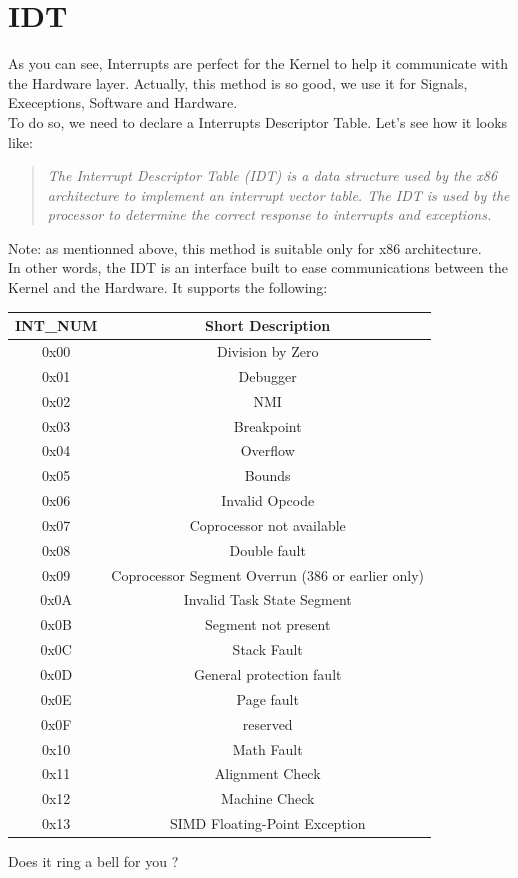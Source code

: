 \documentclass{42-en}
\begin{document}
	\section{IDT}
	As you can see, Interrupts are perfect for the Kernel to help it
    communicate with the Hardware layer. Actually, this method is so
    good, we use it for Signals, Execeptions, Software and Hardware.\\
	To do so, we need to declare a Interrupts Descriptor Table. Let's
    see how it looks like:
	\begin{quotation}
		\textit{The Interrupt Descriptor Table (IDT) is a data
          structure used by the x86 architecture to implement an
          interrupt vector table.  The IDT is used by the processor to
          determine the correct response to interrupts and
          exceptions.}
	\end{quotation}
	Note: as mentionned above, this method is suitable only for x86
    architecture.\\
    In other words, the IDT is an interface built to
    ease communications between the Kernel and the Hardware. It
    supports the following:
	\begin{center}
		\begin{tabular}{| c | c |}
		\hline
		\textbf{INT\_NUM} & \textbf{Short Description} \\ \hline
		0x00 & Division by Zero\\ \hline
		0x01 & Debugger\\ \hline
		0x02 & NMI\\ \hline
		0x03 & Breakpoint\\ \hline
		0x04 & Overflow\\ \hline
		0x05 & Bounds\\ \hline
		0x06 & Invalid Opcode\\ \hline
		0x07 & Coprocessor not available\\ \hline
		0x08 & Double fault\\ \hline
		0x09 & Coprocessor Segment Overrun (386 or earlier only)\\ \hline
		0x0A & Invalid Task State Segment\\ \hline
		0x0B & Segment not present\\ \hline
		0x0C & Stack Fault\\ \hline
		0x0D & General protection fault\\ \hline
		0x0E & Page fault\\ \hline
		0x0F & reserved\\ \hline
		0x10 & Math Fault\\ \hline
		0x11 & Alignment Check\\ \hline
		0x12 & Machine Check\\ \hline
		0x13 & SIMD Floating-Point Exception\\ \hline
		\end{tabular}
	\end{center}
	Does it ring a bell for you ?
\end{document}
